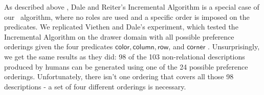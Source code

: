 As described above , Dale and Reiter's
Incremental Algorithm is a special case of our \el\ algorithm, where
no roles are used and a specific order is imposed on the
predicates. We replicated Viethen and Dale's experiment, which tested
the Incremental Algorithm on the drawer domain with all possible
preference orderings given the four predicates $\mathsf{color, column,
row}$, and $\mathsf{corner}$
\cite{viethen06:_algor_for_gener_refer_expres}.  Unsurprisingly, we
get the same results as they did: 98 of the 103 non-relational
descriptions produced by humans can be generated using one of the 24
possible preference orderings. Unfortunately, there isn't one ordering
that covers all those 98 descriptions - a set of four different
orderings is necessary.



